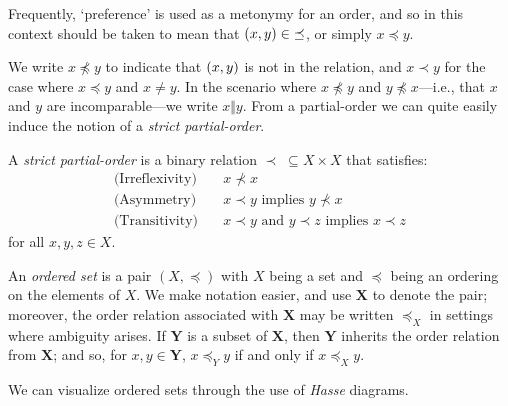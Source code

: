 Frequently, `preference' is used as a metonymy for an order, and so in this context  should be taken to mean that $(x,y) \in \; \preceq$, or simply $x \preceq y$.

We write $x \npreceq y$ to indicate that $(x,y)$ is not in the relation, and $x \prec y$ for the case where $x\preceq y$ and $x \not = y$. In the scenario where $x \not \preceq y$ and $y \not \preceq x$---i.e., that $x$ and $y$ are incomparable---we write $x \Vert y$. From a partial-order we can quite easily induce the notion of a \emph{strict partial-order}.

\begin{definition}
  \label{definition:strict-partial-order}
  A \textit{strict partial-order}  is a binary relation $\prec \; \subseteq X \times X$ that satisfies:
  \begin{align}
     \text{(Irreflexivity)} \quad & x \nprec x \\
     \text{(Asymmetry)} \quad & x \prec y \text{ implies } y \nprec x \\
     \text{(Transitivity)} \quad & x \prec y \text{ and } y \prec z \text{ implies } x \prec z
  \end{align}
  for all $x,y,z \in X$.
\end{definition}

An \textit{ordered set} is a pair $(X, \preceq)$ with $X$ being a set and $\preceq$ being an ordering on the elements of $X$. We make notation easier, and use $\mathbf{X}$ to denote the pair; moreover, the order relation associated with $\mathbf{X}$ may be written $\preceq_X$ in settings where ambiguity arises. If $\mathbf{Y}$ is a subset of $\mathbf{X}$, then $\mathbf{Y}$ inherits the order relation from $\mathbf{X}$; and so, for $x,y \in \mathbf{Y}$, $x \preceq_Y y$ if and only if $x \preceq_X y$.

We can visualize ordered sets through the use of \textit{Hasse} diagrams.


